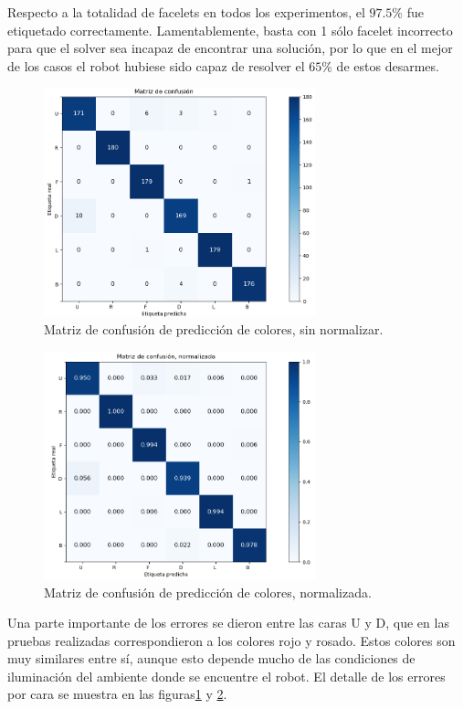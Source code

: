 Respecto a la totalidad de facelets en todos los experimentos, el $97.5$\% fue etiquetado correctamente. Lamentablemente, basta con 1 sólo facelet incorrecto para que el solver sea incapaz de encontrar una solución, por lo que en el mejor de los casos el robot hubiese sido capaz de resolver el $65$\% de estos desarmes.

\begin{figure}[h!]
	\centering
	\includegraphics[width=0.7\textwidth]{figures/conf_matrix}
	\caption{Matriz de confusión de predicción de colores, sin normalizar.}
	\label{confusion}
\end{figure}
\begin{figure}[h!]
	\centering
	\includegraphics[width=0.7\textwidth]{figures/conf_matrix_norm}
	\caption{Matriz de confusión de predicción de colores, normalizada.}
	\label{confusionnorm}
\end{figure}

Una parte importante de los errores se dieron entre las caras U y D, que en las pruebas realizadas correspondieron a los colores rojo y rosado. Estos colores son muy similares entre sí, aunque esto depende mucho de las condiciones de iluminación del ambiente donde se encuentre el robot. El detalle de los errores por cara se muestra en las figuras\ref{confusion} y \ref{confusionnorm}.



